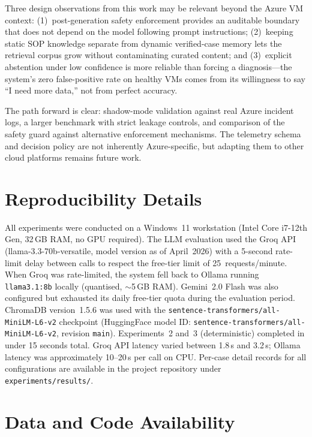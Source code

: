 \documentclass[a4paper,10pt,journal,compsoc]{IEEEtran}
\begin{document}
Three design observations from this work may be relevant beyond the
Azure VM context: (1)~post-generation safety enforcement provides an
auditable boundary that does not depend on the model following prompt
instructions; (2)~keeping static SOP knowledge separate from dynamic
verified-case memory lets the retrieval corpus grow without
contaminating curated content; and (3)~explicit abstention under low
confidence is more reliable than forcing a diagnosis---the system's
zero false-positive rate on healthy VMs comes from its willingness to
say ``I need more data,'' not from perfect accuracy.

The path forward is clear: shadow-mode validation against real Azure
incident logs, a larger benchmark with strict leakage controls, and
comparison of the safety guard against alternative enforcement
mechanisms. The telemetry schema and decision policy are not
inherently Azure-specific, but adapting them to other cloud platforms
remains future work.

\section*{Reproducibility Details}

All experiments were conducted on a Windows~11 workstation (Intel
Core i7-12th Gen, 32\,GB RAM, no GPU required). The LLM evaluation
used the Groq API (llama-3.3-70b-versatile, model version as of
April~2026) with a 5-second rate-limit delay between calls to respect
the free-tier limit of 25~requests/minute. When Groq was rate-limited,
the system fell back to Ollama running \texttt{llama3.1:8b} locally
(quantised, $\sim$5\,GB RAM). Gemini~2.0 Flash was also configured
but exhausted its daily free-tier quota during the evaluation period.
ChromaDB version~1.5.6 was used with the
\texttt{sentence-transformers/all-MiniLM-L6-v2} checkpoint
(HuggingFace model ID: \texttt{sentence-transformers/all-MiniLM-L6-v2},
revision \texttt{main}). Experiments~2 and~3 (deterministic) completed
in under 15 seconds total. Groq API latency varied between 1.8\,s and
3.2\,s; Ollama latency was approximately 10--20\,s per call on CPU.
Per-case detail records for all configurations are available in the
project repository under \texttt{experiments/results/}.

\section*{Data and Code Availability}
\end{document}
